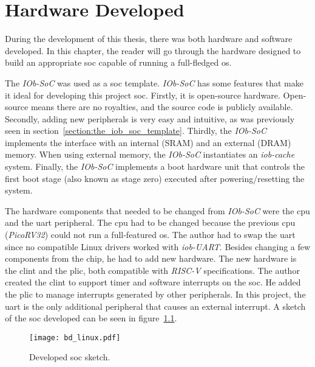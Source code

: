 \chapter{Hardware Developed}
\label{chapter:hardware_developed}
During the development of this thesis, there was both hardware and software developed. In this chapter, the reader will go through the hardware designed to build an appropriate \acrfull{soc} capable of running a full-fledged \acrfull{os}.

The \textit{IOb-SoC} was used as a \acrfull{soc} template. \textit{IOb-SoC} has some features that make it ideal for developing this project \acrshort{soc}. Firstly, it is open-source hardware. Open-source means there are no royalties, and the source code is publicly available. Secondly, adding new peripherals is very easy and intuitive, as was previously seen in section~\ref{section:the_iob_soc_template}. Thirdly, the \textit{IOb-SoC} implements the interface with an internal (SRAM) and an external (DRAM) memory. When using external memory, the \textit{IOb-SoC} instantiates an \textit{iob-cache} system. Finally, the \textit{IOb-SoC} implements a boot hardware unit that controls the first boot stage (also known as stage zero) executed after powering/resetting the system.

The hardware components that needed to be changed from \textit{IOb-SoC} were the \acrfull{cpu} and the \acrfull{uart} peripheral. The \acrshort{cpu} had to be changed because the previous \acrshort{cpu} (\textit{PicoRV32}) could not run a full-featured \acrlong{os}. The author had to swap the \acrshort{uart} since no compatible Linux drivers worked with \textit{iob-UART}. Besides changing a few components from the chip, he had to add new hardware. The new hardware is the \acrshort{clint} and the \acrshort{plic}, both compatible with \textit{RISC-V} specifications. The author created the \acrshort{clint} to support timer and software interrupts on the \acrshort{soc}. He added the \acrshort{plic} to manage interrupts generated by other peripherals. In this project, the \acrshort{uart} is the only additional peripheral that causes an external interrupt. A sketch of the \acrshort{soc} developed can be seen in figure~\ref{fig:bd_linux}.

\begin{figure}[!h]
    \centering
    \texttt{[image: bd\_linux.pdf]}
    \caption{Developed \acrshort{soc} sketch.}
    \label{fig:bd_linux}
\end{figure}

